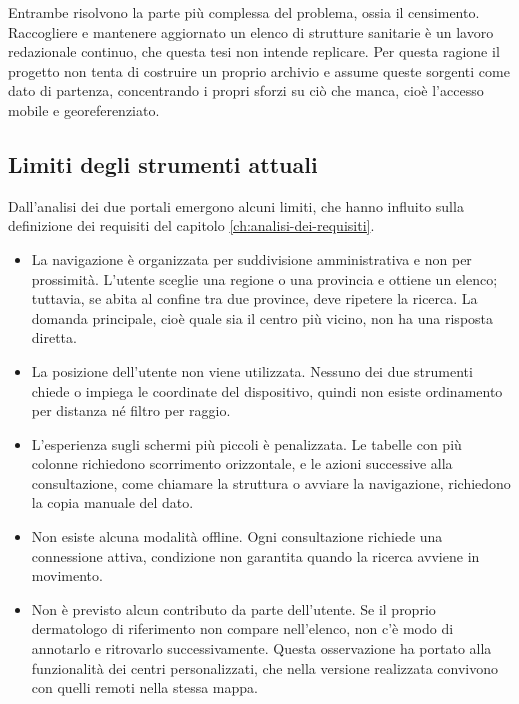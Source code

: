 Entrambe risolvono la parte più complessa del problema, ossia il censimento.
Raccogliere e mantenere aggiornato un elenco di strutture sanitarie è un lavoro redazionale continuo, che questa tesi
non intende replicare. %
Per questa ragione il progetto non tenta di costruire un proprio archivio e assume queste sorgenti come dato di partenza,
concentrando i propri sforzi su ciò che manca, cioè l'accesso mobile e georeferenziato.

\subsection{Limiti degli strumenti attuali}\label{subsec:limiti-strumenti}

Dall'analisi dei due portali emergono alcuni limiti, che hanno influito sulla definizione dei requisiti del
capitolo \ref{ch:analisi-dei-requisiti}.

\begin{itemize}
  \item La navigazione è organizzata per suddivisione amministrativa e non per prossimità.
  L'utente sceglie una regione o una provincia e ottiene un elenco; tuttavia, se abita al confine tra due province, deve ripetere la ricerca.
  La domanda principale, cioè quale sia il centro più vicino, non ha una risposta diretta.
  \item La posizione dell'utente non viene utilizzata.
  Nessuno dei due strumenti chiede o impiega le coordinate del dispositivo, quindi non esiste ordinamento per distanza né filtro per raggio.
  \item L'esperienza sugli schermi più piccoli è penalizzata.
  Le tabelle con più colonne richiedono scorrimento orizzontale, e le azioni successive alla consultazione, come chiamare la
  struttura o avviare la navigazione, richiedono la copia manuale del dato.
  \item Non esiste alcuna modalità offline.
  Ogni consultazione richiede una connessione attiva, condizione non garantita quando la ricerca avviene in movimento.
  \item Non è previsto alcun contributo da parte dell'utente.
  Se il proprio dermatologo di riferimento non compare nell'elenco, non c'è modo di annotarlo e ritrovarlo successivamente.
  Questa osservazione ha portato alla funzionalità dei centri personalizzati, che nella versione realizzata convivono con quelli
  remoti nella stessa mappa.
\end{itemize}

